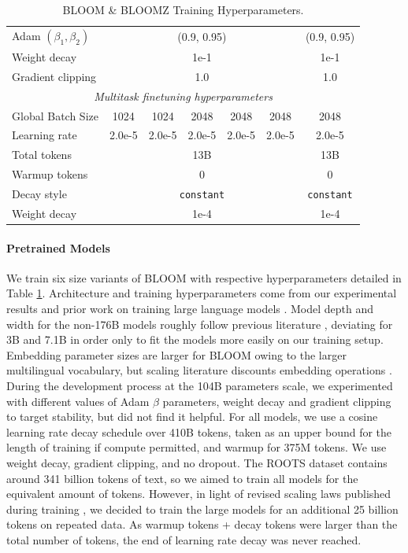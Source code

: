 \documentclass[twoside,11pt]{article}
\begin{document}
\begin{table}[ht]
\begin{center}
{\begin{tabular}{l|ccccc|c}
    Adam $(\beta_1, \beta_2)$ & \multicolumn{5}{c|}{(0.9, 0.95)} & (0.9, 0.95) \\     
    Weight decay & \multicolumn{5}{c|}{1e-1} & 1e-1 \\ 
    Gradient clipping & \multicolumn{5}{c|}{1.0} & 1.0 \\
    \midrule
    \multicolumn{7}{c}{\emph{Multitask finetuning hyperparameters}} \\
    \midrule
    Global Batch Size  & 1024 & 1024 & 2048 & 2048 & 2048 & 2048 \\ 
    Learning rate & 2.0e-5 & 2.0e-5 & 2.0e-5 & 2.0e-5 & 2.0e-5 &  2.0e-5  \\ 
    Total tokens & \multicolumn{5}{c|}{13B} & 13B \\ 
    Warmup tokens & \multicolumn{5}{c|}{0} & 0 \\ 
    Decay style & \multicolumn{5}{c|}{\texttt{constant}} & \texttt{constant}
    \\     
    Weight decay & \multicolumn{5}{c|}{1e-4} & 1e-4 \\ 
    \end{tabular}
}
\caption{BLOOM \& BLOOMZ Training Hyperparameters.}
\label{table:hp}
\end{center}
\end{table}

\paragraph{Pretrained Models} We train six size variants of BLOOM with respective hyperparameters detailed in Table \ref{table:hp}. Architecture and training hyperparameters come from our experimental results \citep{scao2022what} and prior work on training large language models \citep{brown2020language,kaplan2020scaling}. Model depth and width for the non-176B models roughly follow previous literature \citep{brown2020language, zhang2022opt}, deviating for 3B and 7.1B in order only to fit the models more easily on our training setup. Embedding parameter sizes are larger for BLOOM owing to the larger multilingual vocabulary, but scaling literature discounts embedding operations \citep{kaplan2020scaling}. During the development process at the 104B parameters scale, we experimented with different values of Adam $\beta$ parameters, weight decay and gradient clipping to target stability, but did not find it helpful. For all models, we use a cosine learning rate decay schedule \citep{loschchilovcosinedecay} over 410B tokens, taken as an upper bound for the length of training if compute permitted, and warmup for 375M tokens. We use weight decay, gradient clipping, and no dropout. The ROOTS dataset contains around 341 billion tokens of text, so we aimed to train all models for the equivalent amount of tokens. However, in light of revised scaling laws published during training \citep{hoffmann2022training}, we decided to train the large models for an additional 25 billion tokens on repeated data. As warmup tokens + decay tokens were larger than the total number of tokens, the end of learning rate decay was never reached.
\end{document}
